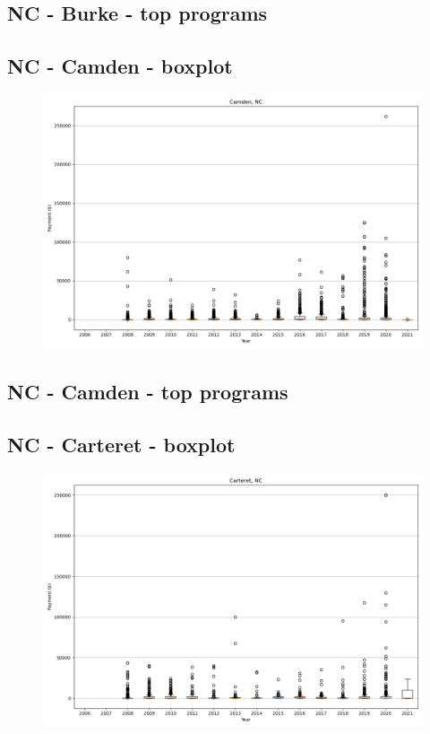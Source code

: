 \subsection*{NC - Burke - top programs}

\newpage
\subsection*{NC - Camden - boxplot}
\begin{figure}[h]
\centering
\includegraphics[width=7in]{../output/boxplots/counties/Camden-NC_boxplot.png}
\end{figure}


\subsection*{NC - Camden - top programs}

\newpage
\subsection*{NC - Carteret - boxplot}
\begin{figure}[h]
\centering
\includegraphics[width=7in]{../output/boxplots/counties/Carteret-NC_boxplot.png}
\end{figure}


